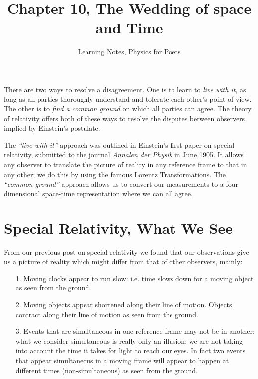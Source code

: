 \documentclass[12pt, letterpaper]{article}
\title{Chapter 10, The Wedding of space and Time}
\author{Learning Notes, Physics for Poets}
\date{}
\begin{document}
    \maketitle

    There are two ways to resolve a disagreement. One is to learn to 
    \textit{live with it}, as long as all parties thoroughly understand and 
    tolerate each other's point of view. The other is to \textit{find a 
    common ground} on which all parties can agree. The theory of relativity 
    offers both of these ways to resolve the disputes between observers 
    implied by Einstein's postulate.
    
    The \textit{``live with it''} approach was outlined in Einstein's first 
    paper on special relativity, submitted to the journal \textit{Annalen der Physik} 
    in June 1905. It allows any observer to translate  the picture of reality 
    in any reference frame to that in any other; we do this by using the famous 
    Lorentz Transformations. The \textit{``common ground''} approach allows 
    us to convert our measurements to a four dimensional space-time representation 
    where we can all agree. 
    
    \section{Special Relativity, What We See}
    From our previous post on special relativity we found that our observations 
    give us a picture of reality which might differ from that of other observers, 
    mainly:
    
    \begin{itemize}
        \item[1. ] Moving clocks appear to run slow: i.e. time slows down 
        for a moving object as seen from the ground.
        \item[2. ] Moving objects appear shortened along their line of 
        motion. Objects contract along their line of motion as seen from the 
        ground.
        \item[3. ] Events that are simultaneous in one reference frame may 
        not be in another: what we consider simultaneous is really only 
        an illusion; we are not taking into account the time it takes for 
        light to reach our eyes. In fact two events that appear simultaneous 
        in a moving frame will appear to happen at different times (non-simultaneous) 
        as seen from the ground. 
    \end{itemize}    
\end{document}
